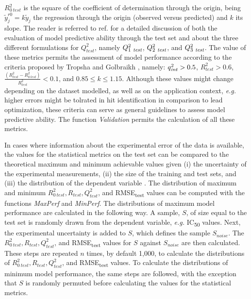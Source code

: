 \documentclass[twoside,a4wide,10pt]{article}
\begin{document}
$R_{0\:test}^2$ is the square of the coefficient of determination through the origin, being $\widetilde{y}_{j}^{ r0} = k \widetilde{y}_j$ the regression through the origin (observed versus predicted) and $k$ its slope.
The reader is referred to ref. \citep{consonni} for a detailed discussion of both the evaluation of model predictive ability through the test set and about the three different formulations for $Q^{2}_{test}$, namely $Q_{1\ {\it test}}^{2}$, $Q_{2\ {\it test}}^{2}$, and $Q_{3\ {\it test}}^{2}$. 
The value of these metrics permits the assessment of model performance according to the criteria proposed by Tropsha and Golbraikh \citep{beware,earnest},
namely:
$q_{{\it int}}^{2} > 0.5$,
$R_{test}^2 > 0.6$,
$ \frac {(R_{test}^2 - R_{0\:test}^2)} {R_{test}^2} < 0.1$, and
$0.85 \leq k \leq 1.15$.
Although these values
might change depending on the dataset modelled, as
well as on the application context, {\it e.g.} higher errors might be tolrated 
in hit identification in comparison to lead optimization,
these criteria can serve as general guidelines to assess model predictive ability.
The function {\it Validation} permits the calculation of all these metrics.

In cases where information about the experimental error of the data is available,
the values for the statistical metrics on the test set
can be compared to the theoretical maximum and minimum achievable values given 
(i) the uncertainty of the experimental measurements,
(ii) the size of the training and test sets,
and (iii) the distribution of the dependent variable \citep{cortesGP,NCI60}.
The distribution of maximum and minimum $R_{0\:test}^2, R_{test}, Q^{2}_{test}$, and RMSE\textsubscript{test} 
values can be computed with the functions {\it MaxPerf} and {\it MinPerf}.
The distributions of maximum model performance are calculated in the following way.
A sample, $S$, of size equal to the test set is randomly drawn from the dependent variable, {\it e.g.} IC\textsubscript{50} values.
Next, the experimental uncertainty is added to $S$, 
which defines the sample $S_{noise}$.
The $R_{0\:test}^2, R_{test}, Q^{2}_{test}$, and RMSE\textsubscript{test} values
for $S$ against $S_{noise}$ are then calculated.
These steps are repeated $n$ times, by default 1,000, to calculate
the distributions of $R_{0\:test}^2, R_{test}, Q^{2}_{test}$, and RMSE\textsubscript{test} values.
To calculate the distributions of minimum model performance,
the same steps are followed, with the exception that $S$ is randomly
permuted before calculating the values for the statistical metrics.
\end{document}
